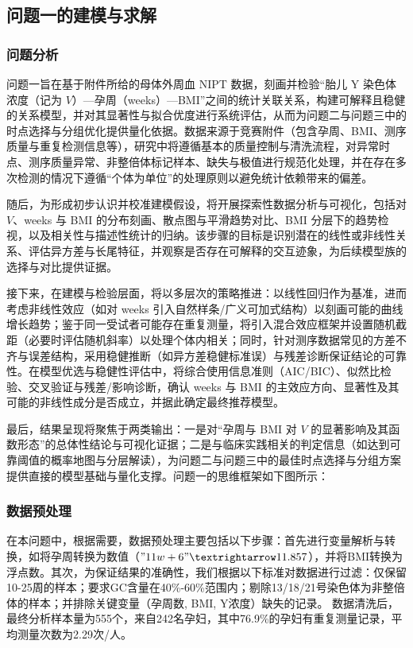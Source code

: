 \documentclass[withoutpreface]{cumcmthesis}
\begin{document}
\subsection{问题一的建模与求解}
\subsubsection{问题分析}

问题一旨在基于附件所给的母体外周血 NIPT 数据，刻画并检验“胎儿 Y 染色体浓度（记为 $V$）—孕周（weeks）—BMI”之间的统计关联关系，构建可解释且稳健的关系模型，并对其显著性与拟合优度进行系统评估，从而为问题二与问题三中的时点选择与分组优化提供量化依据。数据来源于竞赛附件（包含孕周、BMI、测序质量与重复检测信息等），研究中将遵循基本的质量控制与清洗流程，对异常时点、测序质量异常、非整倍体标记样本、缺失与极值进行规范化处理，并在存在多次检测的情况下遵循“个体为单位”的处理原则以避免统计依赖带来的偏差。

随后，为形成初步认识并校准建模假设，将开展探索性数据分析与可视化，包括对 $V$、weeks 与 BMI 的分布刻画、散点图与平滑趋势对比、BMI 分层下的趋势检视，以及相关性与描述性统计的归纳。该步骤的目标是识别潜在的线性或非线性关系、评估异方差与长尾特征，并观察是否存在可解释的交互迹象，为后续模型族的选择与对比提供证据。

接下来，在建模与检验层面，将以多层次的策略推进：以线性回归作为基准，进而考虑非线性效应（如对 weeks 引入自然样条/广义可加式结构）以刻画可能的曲线增长趋势；鉴于同一受试者可能存在重复测量，将引入混合效应框架并设置随机截距（必要时评估随机斜率）以处理个体内相关；同时，针对测序数据常见的方差不齐与误差结构，采用稳健推断（如异方差稳健标准误）与残差诊断保证结论的可靠性。在模型优选与稳健性评估中，将综合使用信息准则（AIC/BIC）、似然比检验、交叉验证与残差/影响诊断，确认 weeks 与 BMI 的主效应方向、显著性及其可能的非线性成分是否成立，并据此确定最终推荐模型。

最后，结果呈现将聚焦于两类输出：一是对“孕周与 BMI 对 $V$ 的显著影响及其函数形态”的总体性结论与可视化证据；二是与临床实践相关的判定信息（如达到可靠阈值的概率地图与分层解读），为问题二与问题三中的最佳时点选择与分组方案提供直接的模型基础与量化支撑。问题一的思维框架如下图所示：

\subsubsection{数据预处理}
在本问题中，根据需要，数据预处理主要包括以下步骤：首先进行变量解析与转换，如将孕周转换为数值（$"11w+6" → 11.857$），并将BMI转换为浮点数。其次，为保证结果的准确性，我们根据以下标准对数据进行过滤：仅保留10-25周的样本；要求GC含量在40\%-60\%范围内；剔除13/18/21号染色体为非整倍体的样本；并排除关键变量（孕周数, BMI, Y浓度）缺失的记录。
数据清洗后，最终分析样本量为555个，来自242名孕妇，其中76.9\%的孕妇有重复测量记录，平均测量次数为2.29次/人。
\end{document}
